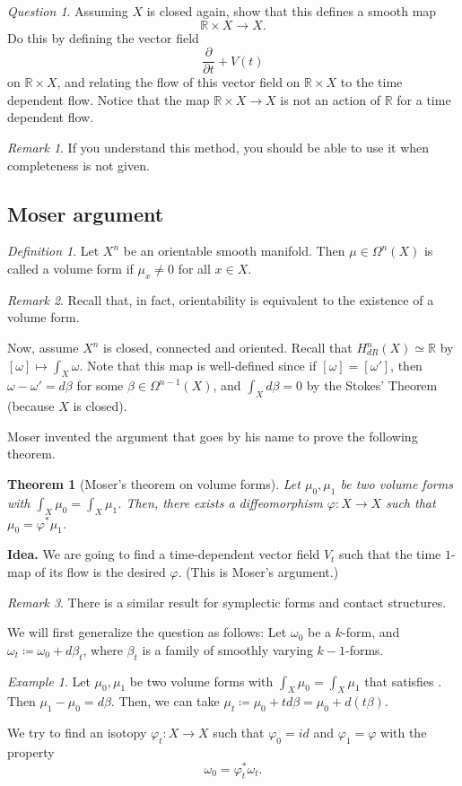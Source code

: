 \documentclass[12pt]{amsart}
\newtheorem{theorem}{Theorem}
\newcommand{\R}{\mathbb{R}} %
\theoremstyle{remark}
\newtheorem{definition}{Definition}
\newtheorem{remark}{Remark}
\newtheorem{question}{Question}
\newtheorem{example}{Example}
\begin{document}
\begin{question}
Assuming $X$ is closed again, show that this defines a smooth map $$\mathbb{R}\times X\to X.$$ Do this by defining the vector field $$\frac{\partial}{\partial t}+V(t)$$ on $\mathbb{R}\times X$, and relating the flow of this vector field on $\mathbb{R}\times X$ to the time dependent flow. Notice that the map $\mathbb{R}\times X\to X$  is not an action of $\mathbb{R}$ for a time dependent flow.
\end{question}

\begin{remark}
If you understand this method, you should be able to use it when completeness is not given.
\end{remark}

\subsection{Moser argument}

\begin{definition}
Let $X^n$ be an orientable smooth manifold. Then $\mu \in \Omega^n(X)$ is called a volume form if $\mu_x\neq 0$ for all $x\in X$.  
\end{definition}
\begin{remark}
Recall that, in fact, orientability is equivalent to the existence of a volume form.
\end{remark}
Now, assume $X^n$ is closed, connected and oriented. Recall that $H^n_{dR}(X)\simeq \R$ by $[\omega]\mapsto \int_X\omega$. Note that this map is well-defined since if $[\omega]=[\omega']$, then $\omega-\omega'=d\beta$ for some $\beta\in \Omega^{n-1}(X)$, and $\int_X d\beta=0$ by the Stokes' Theorem (because $X$ is closed).

Moser invented the argument that goes by his name to prove the following theorem.
\begin{theorem}[Moser's theorem on volume forms]
Let $\mu_0,\mu_1$ be two volume forms with $\int_X\mu_0=\int_X\mu_1$. Then, there exists a diffeomorphism $\varphi:X\to X$ such that $\mu_0=\varphi^*\mu_1$.
\end{theorem}
\textbf{Idea.} We are going to find a time-dependent vector field $V_t$ such that the time $1$-map of its flow is the desired $\varphi$. (This is Moser's argument.)
\begin{remark}
There is a similar result for symplectic forms and contact structures. 
\end{remark}
We will first generalize the question as follows: Let $\omega_0$ be a $k$-form, and $\omega_t\coloneqq\omega_0+d\beta_t$, where $\beta_t$ is a family of smoothly varying $k-1$-forms.
\begin{example}
Let $\mu_0,\mu_1$ be two volume forms with $\int_X\mu_0=\int_X\mu_1$ that satisfies . Then $\mu_1-\mu_0=d\beta$. Then, we can take $\mu_t\coloneqq \mu_0+td\beta= \mu_0+d(t\beta)$. 
\end{example}
We try to find an isotopy $\varphi_t:X\to X$ such that $\varphi_0=id$ and $\varphi_1=\varphi$ with the property $$\omega_0=\varphi_t^*\omega_t.$$ 
\end{document}

